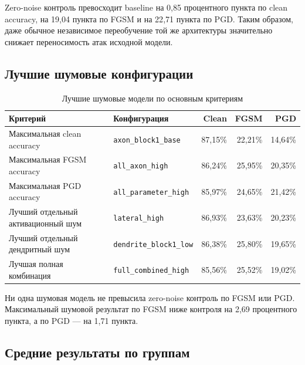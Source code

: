\documentclass[a4paper]{article}
\begin{document}
Zero-noise контроль превосходит baseline на 0{,}85 процентного пункта по clean accuracy, на 19{,}04 пункта по FGSM и на 22{,}71 пункта по PGD. Таким образом, даже обычное независимое переобучение той же архитектуры значительно снижает переносимость атак исходной модели.

\subsection{Лучшие шумовые конфигурации}

\begin{table}[H]
\centering
\small
\begin{tabular}{p{4.1cm}p{4.4cm}rrr}
\toprule
Критерий & Конфигурация & Clean & FGSM & PGD\\
\midrule
Максимальная clean accuracy & \texttt{axon\_block1\_base} & 87{,}15\% & 22{,}21\% & 14{,}64\%\\
Максимальная FGSM accuracy & \texttt{all\_axon\_high} & 86{,}24\% & 25{,}95\% & 20{,}35\%\\
Максимальная PGD accuracy & \texttt{all\_parameter\_high} & 85{,}97\% & 24{,}65\% & 21{,}42\%\\
Лучший отдельный активационный шум & \texttt{lateral\_high} & 86{,}93\% & 23{,}63\% & 20{,}23\%\\
Лучший отдельный дендритный шум & \texttt{dendrite\_block1\_low} & 86{,}38\% & 25{,}80\% & 19{,}65\%\\
Лучшая полная комбинация & \texttt{full\_combined\_high} & 85{,}56\% & 25{,}52\% & 19{,}02\%\\
\bottomrule
\end{tabular}
\caption{Лучшие шумовые модели по основным критериям}
\label{tab:best}
\end{table}

Ни одна шумовая модель не превысила zero-noise контроль по FGSM или PGD. Максимальный шумовой результат по FGSM ниже контроля на 2{,}69 процентного пункта, а по PGD --- на 1{,}71 пункта.

\subsection{Средние результаты по группам}
\end{document}
